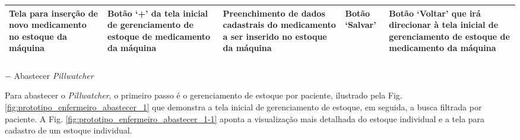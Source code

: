 \begin{table}[H]
\begin{adjustbox}{max width = \textwidth}
\begin{tabular}{|L{5cm}|L{4cm}|L{6cm}|L{4cm}|L{4cm}|}
            \hline
            Tela para inserção de novo medicamento no estoque da máquina & Botão `+' da tela inicial de gerenciamento de estoque de medicamento da máquina & Preenchimento de dados cadastrais do medicamento a ser inserido no estoque da máquina & Botão `Salvar' & Botão `Voltar' que irá direcionar à tela inicial de gerenciamento de estoque de medicamento da máquina \\ 
            \hline
        \end{tabular}
    \end{adjustbox}
\end{table}

\subparagraph*{} $-$ Abastecer \textit{Pillwatcher}

Para abastecer o \textit{Pillwatcher}, o primeiro passo é o gerenciamento de estoque por paciente, ilustrado pela Fig. \ref{fig:prototipo_enfermeiro_abastecer_1} que demonstra a tela inicial de gerenciamento de estoque, em seguida, a busca filtrada por paciente. A Fig. \ref{fig:prototipo_enfermeiro_abastecer_1-1} aponta a visualização mais detalhada do estoque individual e a tela para cadastro de um estoque individual. 

